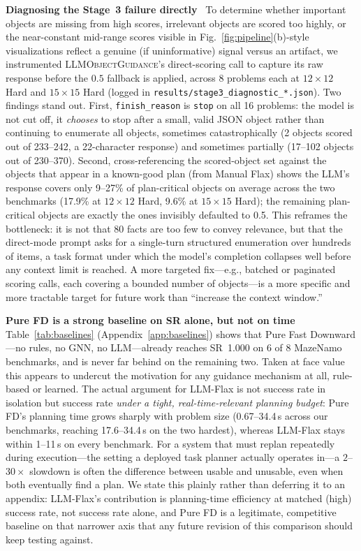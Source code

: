\documentclass[letterpaper, 10pt, journal, twoside]{IEEEtran}
\newcommand{\fref}[1]{Fig.~\ref{#1}}
\newcommand{\tref}[1]{Table~\ref{#1}}
\newcommand{\myparagraph}[1]{\noindent\textbf{#1}~}
\newcommand{\method}{LLM-Flax\xspace}
\begin{document}
\myparagraph{Diagnosing the Stage~3 failure directly}
\label{sec:stage3_diagnosis}
To determine whether important objects are missing from high scores, irrelevant objects are scored too highly, or the near-constant mid-range scores visible in \fref{fig:pipeline}(b)-style visualizations reflect a genuine (if uninformative) signal versus an artifact, we instrumented \textsc{LLMObjectGuidance}'s direct-scoring call to capture its raw response before the $0.5$ fallback is applied, across 8 problems each at $12{\times}12$ Hard and $15{\times}15$ Hard (logged in \texttt{results/stage3\_diagnostic\_*.json}).
Two findings stand out.
First, \texttt{finish\_reason} is \texttt{stop} on all 16 problems: the model is not cut off, it \emph{chooses} to stop after a small, valid JSON object rather than continuing to enumerate all objects, sometimes catastrophically (2 objects scored out of 233--242, a 22-character response) and sometimes partially (17--102 objects out of 230--370).
Second, cross-referencing the scored-object set against the objects that appear in a known-good plan (from Manual Flax) shows the LLM's response covers only 9--27\% of plan-critical objects on average across the two benchmarks (17.9\% at $12{\times}12$ Hard, 9.6\% at $15{\times}15$ Hard); the remaining plan-critical objects are exactly the ones invisibly defaulted to 0.5.
This reframes the bottleneck: it is not that 80 facts are too few to convey relevance, but that the direct-mode prompt asks for a single-turn structured enumeration over hundreds of items, a task format under which the model's completion collapses well before any context limit is reached.
A more targeted fix---e.g., batched or paginated scoring calls, each covering a bounded number of objects---is a more specific and more tractable target for future work than ``increase the context window.''

\myparagraph{Pure FD is a strong baseline on SR alone, but not on time}
\tref{tab:baselines} (Appendix~\ref{app:baselines}) shows that Pure Fast Downward---no rules, no GNN, no LLM---already reaches SR~1.000 on 6 of 8 MazeNamo benchmarks, and is never far behind on the remaining two.
Taken at face value this appears to undercut the motivation for any guidance mechanism at all, rule-based or learned.
The actual argument for \method is not success rate in isolation but success rate \emph{under a tight, real-time-relevant planning budget}: Pure FD's planning time grows sharply with problem size (0.67--34.4\,s across our benchmarks, reaching 17.6--34.4\,s on the two hardest), whereas \method stays within 1--11\,s on every benchmark.
For a system that must replan repeatedly during execution---the setting a deployed task planner actually operates in---a $2$--$30\times$ slowdown is often the difference between usable and unusable, even when both eventually find a plan.
We state this plainly rather than deferring it to an appendix: \method's contribution is planning-time efficiency at matched (high) success rate, not success rate alone, and Pure FD is a legitimate, competitive baseline on that narrower axis that any future revision of this comparison should keep testing against.
\end{document}
